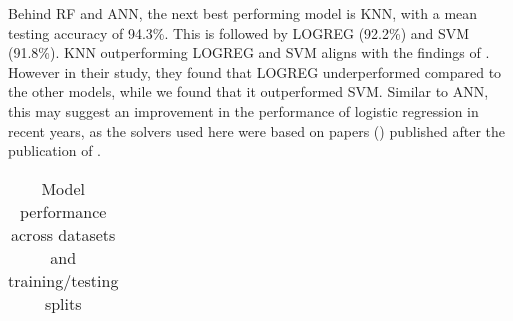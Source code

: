 \documentclass{article}
\begin{document}
Behind RF and ANN, the next best performing model is KNN, with a mean testing
accuracy of 94.3\%. This is followed by LOGREG (92.2\%) and SVM (91.8\%). KNN
outperforming LOGREG and SVM aligns with the findings of
\cite{empirical-comparison}. However in their study, they found that LOGREG
underperformed compared to the other models, while we found that it
outperformed SVM. Similar to ANN, this may suggest an improvement in the
performance of logistic regression in recent years, as the solvers used here
were based on papers (\citet{saga,liblinear}) published after the publication
of \citet{empirical-comparison}.

\begin{table}
	\caption{Model performance across datasets and training/testing splits
	}

	\label{model-performance-table}
	\begin{adjustbox}{max width=1.3\textwidth,center}
		\begin{tabular}{l|ccc|ccc|ccc|ccc|ccc|ccc|ccc}
			\toprule


\end{tabular}
\end{adjustbox}
\end{table}
\end{document}
